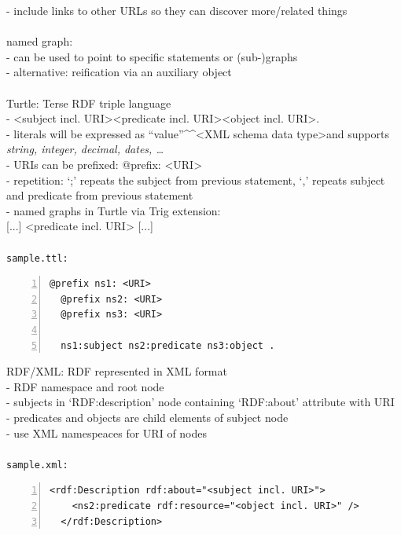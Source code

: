 - include links to other URLs so they can discover more/related things \\
\\
named graph: \\
- can be used to point to specific statements or (sub-)graphs \\
- alternative: reification via an auxiliary object \\
\\
Turtle: Terse RDF triple language \\
- \textless subject incl. URI\textgreater \textless predicate incl. URI\textgreater \textless object incl. URI\textgreater . \\
- literals will be expressed as ``value''\^{}\^{}\textless XML schema data type\textgreater and supports \textit{string, integer, decimal, dates, \ldots} \\
- URIs can be prefixed: @prefix: \textless URI\textgreater \\
- repetition: `;' repeats the subject from previous statement, `,' repeats subject and predicate from previous statement \\
- named graphs in Turtle via Trig extension: \\
  { [...] } \textless predicate incl. URI\textgreater { [...] } \\
\\
\texttt{sample.ttl:}
\begin{lstlisting}[basicstyle=\ttfamily,numbers=left,numberstyle=\footnotesize\ttfamily,backgroundcolor=\color{sourcegray}]
  @prefix ns1: <URI>
  @prefix ns2: <URI>
  @prefix ns3: <URI>

  ns1:subject ns2:predicate ns3:object .
\end{lstlisting} \vspace{0.5cm}
RDF/XML: RDF represented in XML format \\
- RDF namespace and root node \\
- subjects in `RDF:description' node containing `RDF:about' attribute with URI \\
- predicates and objects are child elements of subject node \\
- use XML namespeaces for URI of nodes \\
\\
\texttt{sample.xml:}
\begin{lstlisting}[basicstyle=\ttfamily,numbers=left,numberstyle=\footnotesize\ttfamily,backgroundcolor=\color{sourcegray}]
  <rdf:Description rdf:about="<subject incl. URI>">
    <ns2:predicate rdf:resource="<object incl. URI>" />
  </rdf:Description>
\end{lstlisting} \vspace{0.5cm}
